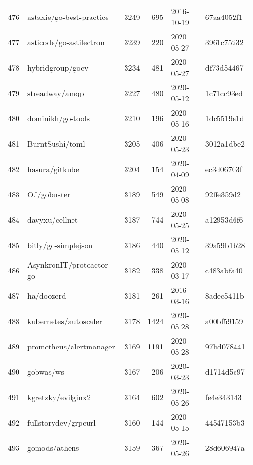 \begin{longtable}{llrrll}
    476 &                           astaxie/go-best-practice &   3249 &    695 & 2016-10-19 &  67aa4052f1 \\
    477 &                            asticode/go-astilectron &   3239 &    220 & 2020-05-27 &  3961c75232 \\
    478 &                                   hybridgroup/gocv &   3234 &    481 & 2020-05-27 &  df73d54467 \\
    479 &                                     streadway/amqp &   3227 &    480 & 2020-05-12 &  1c71cc93ed \\
    480 &                                  dominikh/go-tools &   3210 &    196 & 2020-05-16 &  1dc5519e1d \\
    481 &                                    BurntSushi/toml &   3205 &    406 & 2020-05-23 &  3012a1dbe2 \\
    482 &                                     hasura/gitkube &   3204 &    154 & 2020-04-09 &  ec3d06703f \\
    483 &                                        OJ/gobuster &   3189 &    549 & 2020-05-08 &  92ffe359d2 \\
    484 &                                     davyxu/cellnet &   3187 &    744 & 2020-05-25 &  a12953d6f6 \\
    485 &                                bitly/go-simplejson &   3186 &    440 & 2020-05-12 &  39a59b1b28 \\
    486 &                           AsynkronIT/protoactor-go &   3182 &    338 & 2020-03-17 &  c483abfa40 \\
    487 &                                         ha/doozerd &   3181 &    261 & 2016-03-16 &  8adec5411b \\
    488 &                              kubernetes/autoscaler &   3178 &   1424 & 2020-05-28 &  a00bf59159 \\
    489 &                            prometheus/alertmanager &   3169 &   1191 & 2020-05-28 &  97bd078441 \\
    490 &                                          gobwas/ws &   3167 &    206 & 2020-03-23 &  d1714d5c97 \\
    491 &                                 kgretzky/evilginx2 &   3164 &    602 & 2020-05-26 &  fe4e343143 \\
    492 &                               fullstorydev/grpcurl &   3160 &    144 & 2020-05-15 &  44547153b3 \\
    493 &                                      gomods/athens &   3159 &    367 & 2020-05-26 &  28d606947a \\

\end{longtable}
